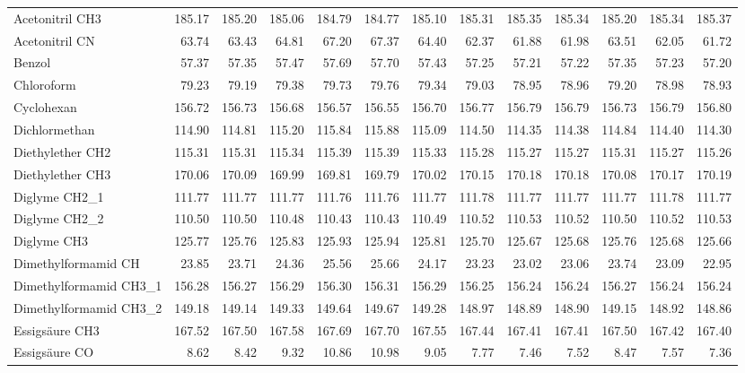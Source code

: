 \begin{table}[ht!]
{\begin{tabular}{lrrrrrrrrrrrr}
    Acetonitril CH3 & 185.17 & 185.20 & 185.06 & 184.79 & 184.77 & 185.10 & 185.31 & 185.35 & 185.34 & 185.20 & 185.34 & 185.37 \\
    Acetonitril CN & 63.74 & 63.43 & 64.81 & 67.20 & 67.37 & 64.40 & 62.37 & 61.88 & 61.98 & 63.51 & 62.05 & 61.72 \\
    Benzol & 57.37 & 57.35 & 57.47 & 57.69 & 57.70 & 57.43 & 57.25 & 57.21 & 57.22 & 57.35 & 57.23 & 57.20 \\
    Chloroform & 79.23 & 79.19 & 79.38 & 79.73 & 79.76 & 79.34 & 79.03 & 78.95 & 78.96 & 79.20 & 78.98 & 78.93 \\
    Cyclohexan & 156.72 & 156.73 & 156.68 & 156.57 & 156.55 & 156.70 & 156.77 & 156.79 & 156.79 & 156.73 & 156.79 & 156.80 \\
    Dichlormethan & 114.90 & 114.81 & 115.20 & 115.84 & 115.88 & 115.09 & 114.50 & 114.35 & 114.38 & 114.84 & 114.40 & 114.30 \\
    Diethylether CH2 & 115.31 & 115.31 & 115.34 & 115.39 & 115.39 & 115.33 & 115.28 & 115.27 & 115.27 & 115.31 & 115.27 & 115.26 \\
    Diethylether CH3 & 170.06 & 170.09 & 169.99 & 169.81 & 169.79 & 170.02 & 170.15 & 170.18 & 170.18 & 170.08 & 170.17 & 170.19 \\
    Diglyme CH2\_1 & 111.77 & 111.77 & 111.77 & 111.76 & 111.76 & 111.77 & 111.78 & 111.77 & 111.77 & 111.77 & 111.78 & 111.77 \\
    Diglyme CH2\_2 & 110.50 & 110.50 & 110.48 & 110.43 & 110.43 & 110.49 & 110.52 & 110.53 & 110.52 & 110.50 & 110.52 & 110.53 \\
    Diglyme CH3 & 125.77 & 125.76 & 125.83 & 125.93 & 125.94 & 125.81 & 125.70 & 125.67 & 125.68 & 125.76 & 125.68 & 125.66 \\
    Dimethylformamid CH & 23.85 & 23.71 & 24.36 & 25.56 & 25.66 & 24.17 & 23.23 & 23.02 & 23.06 & 23.74 & 23.09 & 22.95 \\
    Dimethylformamid CH3\_1 & 156.28 & 156.27 & 156.29 & 156.30 & 156.31 & 156.29 & 156.25 & 156.24 & 156.24 & 156.27 & 156.24 & 156.24 \\
    Dimethylformamid CH3\_2 & 149.18 & 149.14 & 149.33 & 149.64 & 149.67 & 149.28 & 148.97 & 148.89 & 148.90 & 149.15 & 148.92 & 148.86 \\
    Essigsäure CH3 & 167.52 & 167.50 & 167.58 & 167.69 & 167.70 & 167.55 & 167.44 & 167.41 & 167.41 & 167.50 & 167.42 & 167.40 \\
    Essigsäure CO & 8.62  & 8.42  & 9.32  & 10.86 & 10.98 & 9.05  & 7.77  & 7.46  & 7.52  & 8.47  & 7.57  & 7.36 \\

\end{tabular}}
\end{table}
